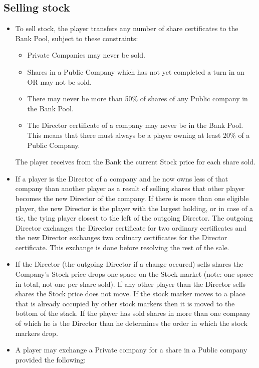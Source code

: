 \documentclass[a4paper]{article}
\begin{document}
\subsection{Selling stock}
\begin{itemize}
	\item To sell stock, the player transfers any number of share certificates
	to the Bank Pool, subject to these constraints:
	\begin{itemize}
		\item Private Companies may never be sold.
		\item Shares in a Public Company which has not yet completed a turn in
		an OR may not be sold.
		\item There may never be more than 50\% of shares of any Public company
		in the Bank Pool.
		\item The Director certificate of a company may never be in the Bank
		Pool. This means that there must always be a player owning at least 20\%
		of a Public Company.
	\end{itemize}
	The player receives from the Bank the current Stock price for each share
	sold.
	\item If a player is the Director of a company and he now owns less of that
	company than another player as a result of selling shares that other player
	becomes the new Director of the company. If there is more than one eligible
	player, the new Director is the player with the largest holding, or in case
	of a tie, the tying player closest to the left of the outgoing Director. The
	outgoing Director exchanges the Director certificate for two ordinary
	certificates and the new Director exchanges two ordinary certificates for
	the Director certificate. This exchange is done before resolving the rest of
	the sale.
	\item If the Director (the outgoing Director if a change occured) sells
	shares the Company's Stock price drops one space on the Stock market (note:
	one space in total, not one per share sold). If any other player than the
	Director sells shares the Stock price does not move. If the stock marker
	moves to a place that is already occupied by other stock markers then it is
	moved to the bottom of the stack. If the player has sold shares in more than
	one company of which he is the Director than he determines the order in
	which the stock markers drop.
	\item A player may exchange a Private company for a share in a Public
	company provided the following:
	\begin{itemize}

\end{itemize}
\end{itemize}
\end{document}
